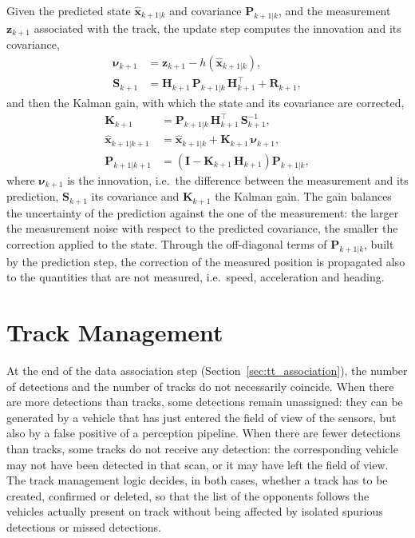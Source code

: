 Given the predicted state $\hat{\mathbf{x}}_{k+1|k}$ and covariance $\mathbf{P}_{k+1|k}$,
and the measurement $\mathbf{z}_{k+1}$ associated with the track, the update step
computes the innovation and its covariance,
\begin{equation}
    \begin{aligned}
        \boldsymbol{\nu}_{k+1} &= \mathbf{z}_{k+1} - h(\hat{\mathbf{x}}_{k+1|k}), \\
        \mathbf{S}_{k+1} &= \mathbf{H}_{k+1}\,\mathbf{P}_{k+1|k}\,\mathbf{H}_{k+1}^\top + \mathbf{R}_{k+1},
    \end{aligned}
    \label{eq:tt_innov}
\end{equation}
and then the Kalman gain, with which the state and its covariance are corrected,
\begin{equation}
    \begin{aligned}
        \mathbf{K}_{k+1} &= \mathbf{P}_{k+1|k}\,\mathbf{H}_{k+1}^\top\,\mathbf{S}_{k+1}^{-1}, \\
        \hat{\mathbf{x}}_{k+1|k+1} &= \hat{\mathbf{x}}_{k+1|k} + \mathbf{K}_{k+1}\,\boldsymbol{\nu}_{k+1}, \\
        \mathbf{P}_{k+1|k+1} &= \left(\mathbf{I} - \mathbf{K}_{k+1}\,\mathbf{H}_{k+1}\right)\mathbf{P}_{k+1|k},
    \end{aligned}
    \label{eq:tt_update}
\end{equation}
where $\boldsymbol{\nu}_{k+1}$ is the innovation, i.e.\ the difference between the
measurement and its prediction, $\mathbf{S}_{k+1}$ its covariance and $\mathbf{K}_{k+1}$
the Kalman gain. The gain balances the uncertainty of the prediction against the one of
the measurement: the larger the measurement noise with respect to the predicted
covariance, the smaller the correction applied to the state. Through the off-diagonal
terms of $\mathbf{P}_{k+1|k}$, built by the prediction step, the correction of the
measured position is propagated also to the quantities that are not measured, i.e.\
speed, acceleration and heading.

\section{Track Management}
\label{sec:tt_management}

At the end of the data association step (Section~\ref{sec:tt_association}), the number of
detections and the number of tracks do not necessarily coincide. When there are more
detections than tracks, some detections remain unassigned: they can be generated by a
vehicle that has just entered the field of view of the sensors, but also by a false
positive of a perception pipeline. When there are fewer detections than tracks, some
tracks do not receive any detection: the corresponding vehicle may not have been detected
in that scan, or it may have left the field of view. The track management logic decides,
in both cases, whether a track has to be created, confirmed or deleted, so that the list
of the opponents follows the vehicles actually present on track without being affected by
isolated spurious detections or missed detections.

